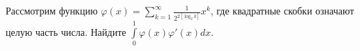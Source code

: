 \documentclass{article}
\begin{document}
Рассмотрим функцию $\varphi(x) = \sum\limits_{k=1}^\infty \frac{1}{2^{2[\log_2 k]}} x^k$, где квадратные скобки означают 
целую часть числа. Найдите $\int\limits_0^1 \varphi(x) \varphi'(x) dx$.
\end{document}
